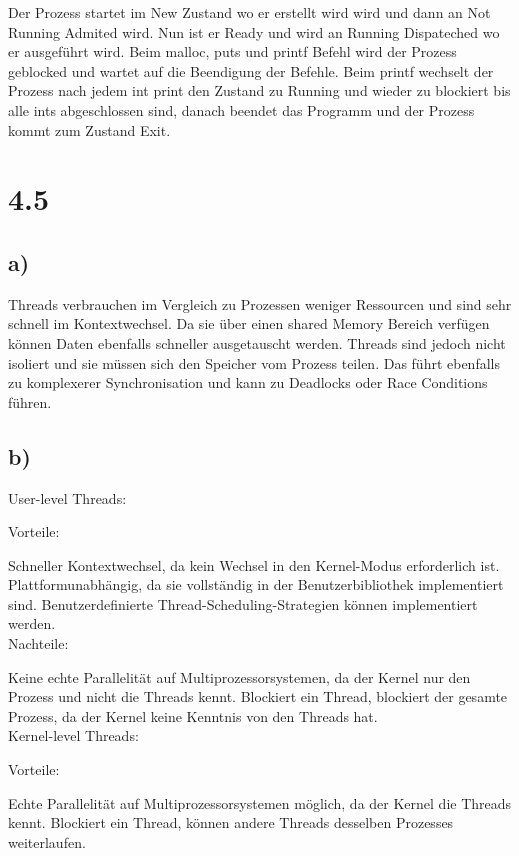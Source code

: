\documentclass[a4paper,12pt]{article}
\begin{document}
Der Prozess startet im New Zustand wo er erstellt wird wird und dann an Not Running Admited wird. Nun ist er Ready und wird an Running Dispateched
wo er ausgeführt wird. Beim malloc, puts und printf Befehl wird der Prozess geblocked und wartet auf die Beendigung der Befehle. Beim printf wechselt der Prozess nach
jedem int print den Zustand zu Running und wieder zu blockiert bis alle ints abgeschlossen sind, danach beendet das Programm und 
der Prozess kommt zum Zustand Exit.

\section*{4.5}

\subsection*{a)}

Threads verbrauchen im Vergleich zu Prozessen weniger Ressourcen und sind sehr schnell im Kontextwechsel. Da sie über einen shared Memory Bereich verfügen können Daten ebenfalls 
schneller ausgetauscht werden. 
Threads sind jedoch nicht isoliert und sie müssen sich den Speicher vom Prozess teilen. Das führt ebenfalls zu komplexerer Synchronisation und kann zu Deadlocks oder Race Conditions 
führen.

\subsection*{b)}
User-level Threads:

Vorteile:

Schneller Kontextwechsel, da kein Wechsel in den Kernel-Modus erforderlich ist.
Plattformunabhängig, da sie vollständig in der Benutzerbibliothek implementiert sind. 
Benutzerdefinierte Thread-Scheduling-Strategien können implementiert werden.
\\

Nachteile:

Keine echte Parallelität auf Multiprozessorsystemen, da der Kernel nur den Prozess und nicht die Threads kennt.
Blockiert ein Thread, blockiert der gesamte Prozess, da der Kernel keine Kenntnis von den Threads hat.
\\

Kernel-level Threads:

Vorteile:

Echte Parallelität auf Multiprozessorsystemen möglich, da der Kernel die Threads kennt.
Blockiert ein Thread, können andere Threads desselben Prozesses weiterlaufen.
\\
\end{document}
